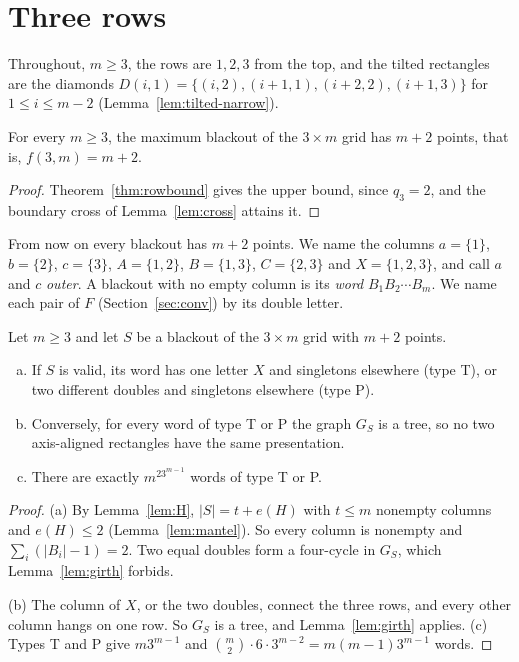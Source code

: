 \section{Three rows}\label{sec:three}

Throughout, $m\ge3$, the rows are $1,2,3$ from the top, and the
tilted rectangles are the diamonds $D(i,1)=\{(i,2),(i+1,1),(i+2,2),(i+1,3)\}$ for
$1\le i\le m-2$ (Lemma~\ref{lem:tilted-narrow}).

\begin{theorem}\label{thm:threevalue}
For every $m\ge3$, the maximum blackout of the $3\times m$ grid has $m+2$ points, that is,
$f(3,m)=m+2$.
\end{theorem}

\begin{proof}
Theorem~\ref{thm:rowbound} gives the upper bound, since $q_3=2$, and the boundary cross of
Lemma~\ref{lem:cross} attains it.
\end{proof}

From now on every blackout has $m+2$ points. We name the columns $a=\{1\}$, $b=\{2\}$,
$c=\{3\}$, $A=\{1,2\}$, $B=\{1,3\}$, $C=\{2,3\}$ and $X=\{1,2,3\}$, and call $a$ and $c$
\emph{outer}. A blackout with no empty column is its \emph{word} $B_1B_2\cdots B_m$. We name each
pair of $F$ (Section~\ref{sec:conv}) by its double letter.

\begin{proposition}\label{prop:threeclass}
Let $m\ge3$ and let $S$ be a blackout of the $3\times m$ grid with $m+2$ points.
\begin{enumerate}[(a)]
\item If $S$ is valid, its word has one letter $X$ and singletons elsewhere (type T), or two
different doubles and singletons elsewhere (type P).
\item Conversely, for every word of type T or P the graph $G_S$ is a tree, so no two
axis-aligned rectangles have the same presentation.
\item There are exactly $m^23^{m-1}$ words of type T or P.
\end{enumerate}
\end{proposition}

\begin{proof}
(a) By Lemma~\ref{lem:H}, $|S|=t+e(H)$ with $t\le m$ nonempty columns and $e(H)\le2$
(Lemma~\ref{lem:mantel}). So every column is nonempty and $\sum_i(|B_i|-1)=2$. Two equal doubles form a four-cycle in $G_S$, which
Lemma~\ref{lem:girth} forbids.

(b) The column of $X$, or the two doubles, connect the three rows, and every other column hangs
on one row. So $G_S$ is a tree, and Lemma~\ref{lem:girth} applies. (c) Types T and P give $m3^{m-1}$ and $\binom m2\cdot6\cdot3^{m-2}=m(m-1)3^{m-1}$ words.
\end{proof}

